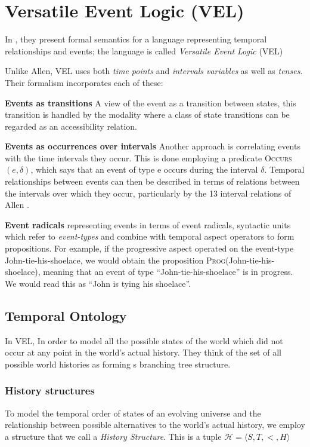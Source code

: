 \section{Versatile Event Logic (VEL)}
In \cite{bennett2001unifying}, they present formal semantics for a language representing temporal relationships and events; the language is called \textit{Versatile Event Logic }(VEL)

Unlike Allen, VEL uses both \textit{time points} and \textit{intervals variables} as well as \textit{tenses}.
Their formalism incorporates each of these:


\textbf{Events as transitions} A view of the event as a transition between states, this transition is handled by the modality
where a class of state transitions can be regarded as an accessibility relation.

\textbf{Events as occurrences over intervals}
Another approach is correlating events with the time intervals they occur.
This is done employing a predicate \textsc{Occurs}$(e, \delta)$, which says that an event of type e occurs during
the interval $\delta$. Temporal relationships between events can then be described in terms of
relations between the intervals over which they occur, particularly by the 13 interval
relations of Allen \cite{allen1984towards}.

\textbf{Event radicals} representing events in terms of event radicals, syntactic
units which refer to \textit{event-types} and combine with temporal aspect operators to form
propositions. For example, if the
progressive aspect operated on the event-type John-tie-his-shoelace, we would obtain the proposition \textsc{Prog}(John-tie-his-shoelace), meaning
that an event of type ``John-tie-his-shoelace'' is in progress. We would read this as ``John is
tying his shoelace''.


\subsection{Temporal Ontology}
In VEL, In order to model all the possible states of the world which did not occur at any point in the world's actual history. They think of the set of all possible world histories as forming s branching tree structure.

\subsubsection{History structures}
To model the temporal order of states of an evolving universe and the relationship
between possible alternatives to the world's actual history, we employ a structure that
we call a \textit{History Structure}. This is a tuple $\mathcal{H} = \langle S, T, <, H \rangle$

